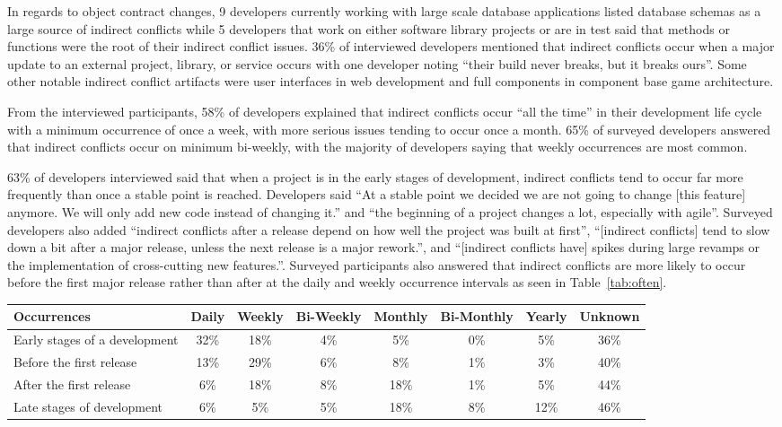 \documentclass[conference]{IEEEtran}
\begin{document}
In regards to object contract changes, 9 developers currently working with large scale database applications listed database
schemas as a large source of indirect conflicts while 5 developers that work on either software
library projects or are in test said that methods or functions were the root of their indirect conflict issues. 
36\% of interviewed developers mentioned that indirect conflicts occur when a major update to an external project, 
library, or service occurs with one developer noting ``their build never breaks, but it breaks ours''. Some
other notable indirect conflict artifacts were user interfaces in web development and full components in component 
base game architecture. 

From the interviewed participants, 58\% of developers explained that indirect conflicts occur ``all the time'' in
their development life cycle with a minimum occurrence of once a week, with more serious issues tending
to occur once a month. 65\% of surveyed developers answered that indirect conflicts occur on minimum bi-weekly,
with the majority of developers saying that weekly occurrences are most common.  

63\% of developers interviewed said that
when a project is in the early stages of development, indirect conflicts tend to occur far more frequently
than once a stable point is reached. Developers said ``At a stable point we decided we are not going to change
[this feature] anymore. We will only add new code instead of changing it.'' and ``the beginning of a project 
changes a lot, especially with agile''. Surveyed developers also added ``indirect conflicts after a release 
depend on how well the project was built at first'', ``[indirect conflicts] tend to slow down a bit after a 
major release, unless the next release is a major rework.'', and ``[indirect conflicts have] spikes during 
large revamps or the implementation of cross-cutting new features.''. Surveyed participants also answered that 
indirect conflicts are more likely to occur before the first major release rather than after at the daily
and weekly occurrence intervals as seen in Table~\ref{tab:often}.

\begin{table*}[tb!]
\begin{center}
\begin{tabular}{| p{7cm} | c | c | c | c | c | c | c |}
\hline
Occurrences & Daily & Weekly & Bi-Weekly & Monthly & Bi-Monthly & Yearly & Unknown \\
\hline
\hline
Early stages of a development & 32\% & 18\% & 4\% & 5\% & 0\% & 5\% & 36\% \\ \hline
Before the first release & 13\% & 29\% & 6\% & 8\% & 1\% & 3\% & 40\% \\ \hline
After the first release & 6\% & 18\% & 8\% & 18\% & 1\% & 5\% & 44\% \\ \hline
Late stages of development & 6\% & 5\% & 5\% & 18\% & 8\% & 12\% & 46\% \\ \hline
\end{tabular}
\end{center}
\caption{Results of survey questions to how often indirect conflicts occur, in terms of percentage
of developers surveyed.\label{tab:often}}
\end{table*}
\end{document}
